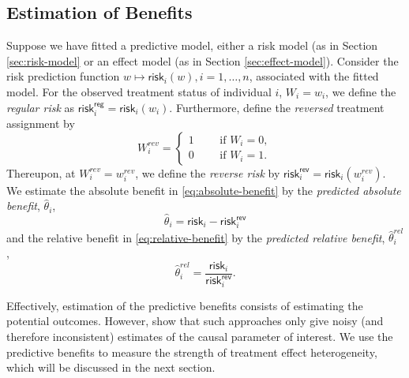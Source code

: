 \documentclass[11pt]{article}
\begin{document}
\subsection{Estimation of Benefits}
Suppose we have fitted a predictive model, either a risk model (as in Section \ref{sec:risk-model} or an effect model (as in Section \ref{sec:effect-model}). Consider the risk prediction function $w \mapsto \textsf{risk}_i(w), i=1,\dots,n$, associated with the fitted model. 
For the observed treatment status of individual $i$, $W_i = w_i$, we define the \textit{regular risk} as $\textsf{risk}_i^{\textsf{reg}} = \textsf{risk}_i(w_i)$. Furthermore, define the \textit{reversed} treatment assignment by
\[
    W_i^{rev} = 
    \begin{cases}
    1 \qquad \text{ if } W_i = 0,\\
    0 \qquad \text{ if } W_i = 1.
    \end{cases}
\]
Thereupon, at $W_i^{rev} = w_i^{rev}$, we define the \textit{reverse risk} by $\textsf{risk}_i^{\textsf{rev}} = \textsf{risk}_i(w_i^{rev})$. We estimate the absolute benefit in \eqref{eq:absolute-benefit} by the \textit{predicted absolute benefit}, $\widehat{\theta}_i$,
\[
    \widehat{\theta}_i 
    =
    \textsf{risk}_i
    -
    \textsf{risk}_i^{\textsf{rev}}
\]
and the relative benefit in \eqref{eq:relative-benefit} by the \textit{predicted relative benefit}, $\widehat{\theta}^{rel}_i$, 
\[
    \widehat{\theta}_i^{rel} 
    =
    \frac{\textsf{risk}_i}{\textsf{risk}_i^{\textsf{rev}}}.
\]

Effectively, estimation of the predictive benefits consists of estimating the potential outcomes. However, \cite{chernozhukov2020generic} show that such approaches only give noisy (and therefore inconsistent) estimates of the causal parameter of interest. We use the predictive benefits to measure the strength of treatment effect heterogeneity, which will be discussed in the next section.
\end{document}
